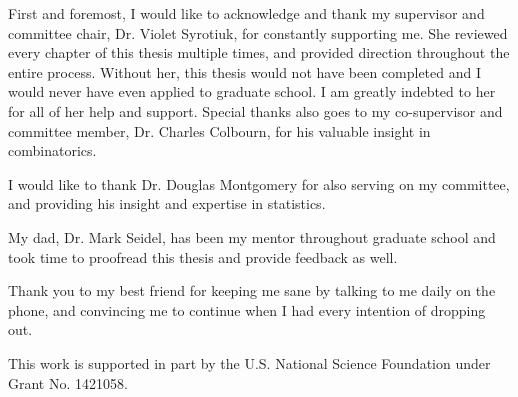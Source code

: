 First and foremost, I would like to acknowledge and thank my supervisor and committee chair, Dr. Violet Syrotiuk, for constantly supporting me.
She reviewed every chapter of this thesis multiple times, and provided direction throughout the entire process.
Without her, this thesis would not have been completed and I would never have even applied to graduate school.
I am greatly indebted to her for all of her help and support.
Special thanks also goes to my co-supervisor and committee member, Dr. Charles Colbourn, for his valuable insight in combinatorics.

I would like to thank Dr. Douglas Montgomery for also serving on my committee, and providing his insight and expertise in statistics.

My dad, Dr. Mark Seidel, has been my mentor throughout graduate school and took time to proofread this thesis and provide feedback as well.

Thank you to my best friend for keeping me sane by talking to me daily on the phone, and convincing me to continue when I had every intention of dropping out.

This work is supported in part by the U.S. National Science Foundation under Grant No. 1421058.
